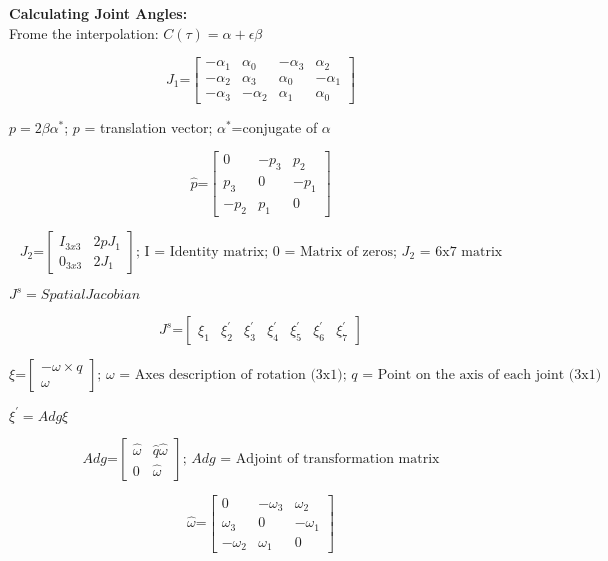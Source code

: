 \documentclass[11pt]{article}
\begin{document}
{\bf Calculating Joint Angles:}
\\ 
Frome the interpolation: $C(\tau)=\alpha+\epsilon\beta$

$$
\text{$J_1$=} \left[
\begin{array}{cccc}
-\alpha_1 & \alpha_0 & -\alpha_3 & \alpha_2 \\
-\alpha_2 & \alpha_3 & \alpha_0 & -\alpha_1 \\
-\alpha_3 & -\alpha_2 & \alpha_1 & \alpha_0
\end{array}
\right]
$$

$p=2\beta\alpha^\ast$;	$p$ = translation vector; $\alpha^\ast$=conjugate of $\alpha$

$$
\text{$\hat{p}$=} \left[
\begin{array}{ccc}
0 & -p_3 & p_2  \\
p_3 & 0 & -p_1  \\
-p_2 & p_1 & 0
\end{array}
\right]
$$

$$
\text{$J_2$=} \left[
\begin{array}{cccc}
I_{3x3} & 2\hat{p}J_1 \\
0_{3x3} & 2J_1
\end{array}
\right] \text{; I = Identity matrix; 0 = Matrix of zeros; $J_2$ = 6x7 matrix}
$$

$J^s = Spatial Jacobian$

$$
\text{$J^s$=} \left[
\begin{array}{ccccccc}
\xi_1 & \xi_2^\prime & \xi_3^\prime & \xi_4^\prime & \xi_5^\prime & \xi_6^\prime & \xi_7^\prime  
\end{array}
\right]
$$

$$
\text{$\xi$=} \left[
\begin{array}{cccc}
-\omega \times q \\
\omega
\end{array}
\right] \text{; $\omega$ = Axes description of rotation (3x1); $q$ = Point on the axis of each joint (3x1)}
$$

$\xi^\prime = Adg \xi$

$$
\text{$Adg$=} \left[
\begin{array}{cccc}
\hat{\omega} & \hat{q}\hat{\omega} \\
0 & \hat{\omega}
\end{array}
\right] \text{; $Adg$ = Adjoint of transformation matrix}
$$

$$
\text{$\hat{\omega}$=} \left[
\begin{array}{ccc}
0 & -\omega_3 & \omega_2  \\
\omega_3 & 0 & -\omega_1  \\
-\omega_2 & \omega_1 & 0
\end{array}
\right]
$$
\end{document}
